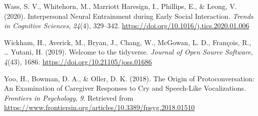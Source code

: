 \documentclass[
  man]{apa6}
\newlength{\cslhangindent}
\newlength{\cslentryspacingunit} %
\newenvironment{CSLReferences}[2] %
 {%
  \setlength{\parindent}{0pt}
  \ifodd #1
  \let\oldpar\par
  \def\par{\hangindent=\cslhangindent\oldpar}
  \fi
  \setlength{\parskip}{#2\cslentryspacingunit}
 }%
 {}
\begin{document}
\begin{CSLReferences}{1}{0}
\leavevmode{}%
Wass, S. V., Whitehorn, M., Marriott Haresign, I., Phillips, E., \& Leong, V. (2020). Interpersonal {Neural} {Entrainment} during {Early} {Social} {Interaction}. \emph{Trends in Cognitive Sciences}, \emph{24}(4), 329--342. \url{https://doi.org/10.1016/j.tics.2020.01.006}

\leavevmode{}%
Wickham, H., Averick, M., Bryan, J., Chang, W., McGowan, L. D., François, R., \ldots{} Yutani, H. (2019). Welcome to the {tidyverse}. \emph{Journal of Open Source Software}, \emph{4}(43), 1686. \url{https://doi.org/10.21105/joss.01686}

\leavevmode{}%
Yoo, H., Bowman, D. A., \& Oller, D. K. (2018). The {Origin} of {Protoconversation}: {An} {Examination} of {Caregiver} {Responses} to {Cry} and {Speech}-{Like} {Vocalizations}. \emph{Frontiers in Psychology}, \emph{9}. Retrieved from \url{https://www.frontiersin.org/articles/10.3389/fpsyg.2018.01510}

\end{CSLReferences}
\end{document}

